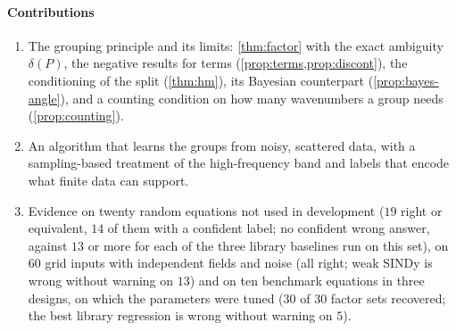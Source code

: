 \documentclass[11pt]{article}
\theoremstyle{plain}
\theoremstyle{definition}
\theoremstyle{remark}
\newcommand{\deltaP}{\delta(P)}             %
\begin{document}
\paragraph{Contributions}
\begin{enumerate}
  \item The grouping principle and its limits: \cref{thm:factor} with the exact ambiguity $\deltaP$, the negative results
  for terms (\cref{prop:terms,prop:discont}), the conditioning of the split (\cref{thm:hm}), its Bayesian counterpart
  (\cref{prop:bayes-angle}), and a counting condition on how many wavenumbers a group needs (\cref{prop:counting}).
  \item An algorithm that learns the groups from noisy, scattered data, with a sampling-based treatment of the
  high-frequency band and labels that encode what finite data can support.
  \item Evidence on twenty random equations not used in development ($19$ right or equivalent, $14$ of them with a confident
  label; no confident wrong answer, against $13$ or more for each of the three library baselines run on this set), on
  $60$ grid inputs with independent fields and noise (all right; weak SINDy is wrong without warning on $13$) and on ten benchmark equations in three designs, on which the
  parameters were tuned ($30$ of $30$ factor sets recovered; the best library regression is wrong without warning on $5$).
\end{enumerate}


\end{document}
